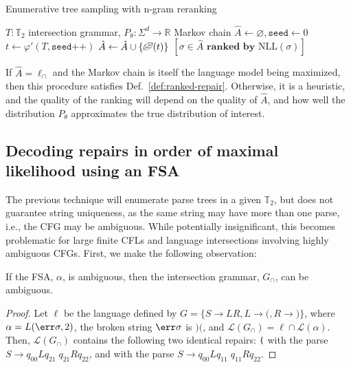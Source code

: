 \documentclass[runningheads]{llncs}
\begin{document}
\begin{algorithm}[H]
\caption{Enumerative tree sampling with n-gram reranking}
\label{alg:enum_ngram}
\begin{algorithmic}[1]
\Require $T: \mathbb{T}_2$ intersection grammar, $P_\theta: \Sigma^d \rightarrow \mathbb{R}$ Markov chain
\State $\hat{A} \gets \varnothing, \texttt{seed} \gets 0$ 
\State $t \gets \varphi'(T, \texttt{seed++})$ 
\State $\hat{A} \gets \hat{A} \cup \{\text{\textleaf}(t)\}$
\EndFor
\State \Return $[\sigma \in \hat{A} \textbf{ ranked by } \text{NLL}(\sigma)]$ 
\end{algorithmic}
\end{algorithm}

If $\hat{A} = \ell_\cap$ and the Markov chain is itself the language model being maximized, then this procedure satisfies Def.~\ref{def:ranked-repair}. Otherwise, it is a heuristic, and the quality of the ranking will depend on the quality of $\hat{A}$, and how well the distribution $P_\theta$ approximates the true distribution of interest.

  \subsection{Decoding repairs in order of maximal likelihood using an FSA}\label{sec:decoding}

  The previous technique will enumerate parse trees in a given $\mathbb{T}_2$, but does not guarantee string uniqueness, as the same string may have more than one parse, i.e., the CFG may be ambiguous. While potentially insignificant, this becomes problematic for large finite CFLs and language intersections involving highly ambiguous CFGs. First, we make the following observation:

\begin{lemma}\label{lemma:ambiguity}
If the FSA, $\alpha$, is ambiguous, then the intersection grammar, $G_\cap$, can be ambiguous.
\end{lemma}

\begin{proof}
Let $\ell$ be the language defined by $G=\{S\rightarrow LR, L \rightarrow\texttt{(}, R \rightarrow\texttt{)}\}$, where $\alpha=L(\err\sigma, 2)$, the broken string $\err\sigma$ is $\texttt{)(}$, and $\mathcal{L}(G_\cap) = \ell \cap \mathcal{L}(\alpha)$. Then, $\mathcal{L}(G_\cap)$ contains the following two identical repairs: \texttt{\hlred{)}(\hlgreen{)}} with the parse $S \rightarrow q_{00}Lq_{21}\phantom{.}q_{21}Rq_{22}$, and \texttt{\hlorange{(}\hlorange{)}} with the parse $S \rightarrow q_{00}Lq_{11}\phantom{.}q_{11}Rq_{22}$.
\end{proof}
\end{document}
